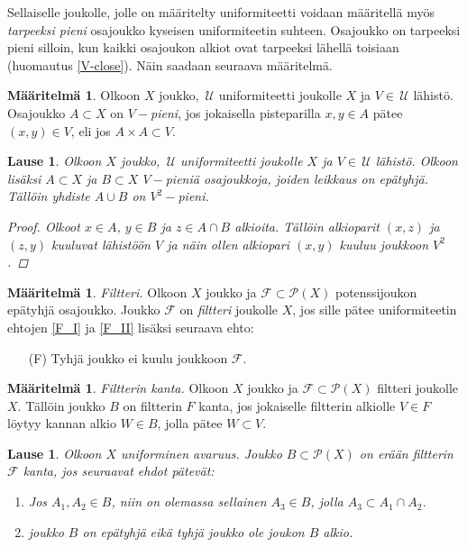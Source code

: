 \documentclass[12pt,a4paper,leqno]{report}
\newcommand{\U}{\,\mathcal{U}}
\newcommand{\Pot}{\mathcal{P}}
\newcommand{\F}{\mathcal{F}}
\theoremstyle{plain}
\newtheorem{lause}[equation]{Lause}
\theoremstyle{definition}
\newtheorem{maar}[equation]{Määritelmä}
\theoremstyle{remark}
\begin{document}
Sellaiselle joukolle, jolle on määritelty uniformiteetti voidaan määritellä myös 
\emph{tarpeeksi pieni} osa\-jouk\-ko kyseisen uniformiteetin suhteen. 
Osajoukko on tarpeeksi pieni silloin, kun kaikki osajoukon alkiot ovat 
tarpeeksi lähellä toisiaan (huomautus \ref{V-close}). 
Näin saadaan seuraava määritelmä.
\begin{maar}
Olkoon $X$ joukko, $\U$ uniformiteetti joukolle $X$ ja $V\in\U$ lähistö. 
Osajoukko $A\subset X$ on \emph{$V-$pieni}, jos 
jokaisella pisteparilla $x,y\in A$ pätee $(x,y)\in V$, eli jos $A\times A\subset V$.
\end{maar}
\begin{lause}
Olkoon $X$ joukko, $\U$ uniformiteetti joukolle $X$ ja $V\in\U$ lähistö. 
Olkoon lisäksi $A\subset X$ ja $B\subset X$ $V-$pieniä osajoukkoja, 
joiden leikkaus on epätyhjä. 
Tällöin yhdiste $A\cup B$ on $V^2-$pieni.
\begin{proof}
Olkoot $x\in A$, $y\in B$ ja $z\in A\cap B$ alkioita. 
Tällöin alkioparit $(x,z)$ ja $(z,y)$ kuuluvat lähistöön $V$ 
ja näin ollen alkiopari $(x,y)$ kuuluu joukkoon $V^2$.
\end{proof}
\end{lause}
\begin{maar}
\emph{Filtteri.} Olkoon $X$ joukko ja $\F\subset \Pot(X)$ potenssijoukon epätyhjä osa\-joukko. 
Joukko $\F$ on \emph{filtteri} joukolle $X$, jos sille pätee 
uniformiteetin ehtojen \ref{F_I} ja \ref{F_II} lisäksi 
seuraava ehto:
\begin{enumerate}
\item[(F)] Tyhjä joukko ei kuulu joukkoon $\F$.
\end{enumerate} 
\end{maar}
\begin{maar}
\emph{Filtterin kanta.} 
Olkoon $X$ joukko ja $\F\subset \Pot(X)$ filtteri joukolle $X$. 
Tällöin joukko $B$ on filtterin $F$ kanta, 
jos jokaiselle filtterin alkiolle $V\in F$ 
löytyy kannan alkio $W\in B $, jolla pätee $W\subset V$.
\end{maar}
\begin{lause}
Olkoon $X$ uniforminen avaruus. Joukko $B\subset\Pot(X)$ on erään filtterin $\F$ kanta, jos seuraavat ehdot pätevät:
\begin{enumerate} 
\item Jos $A_1,A_2\in B$, niin on olemassa sellainen $A_3\in B$, 
jolla $A_3\subset A_1\cap A_2$.
\item joukko $B$ on epätyhjä eikä tyhjä joukko ole joukon $B$ alkio.
\end{enumerate}
\end{lause}
\end{document}
